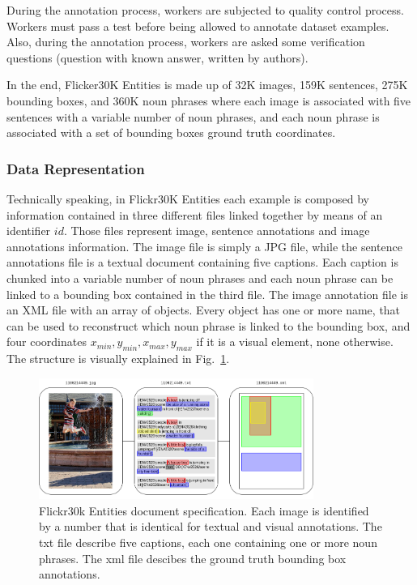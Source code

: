 During the annotation process, workers are subjected to quality
control process. Workers must pass a test before being allowed to
annotate dataset examples. Also, during the annotation process,
workers are asked some verification questions (question with known
answer, written by authors).

In the end, Flicker30K Entities is made up of 32K images, 159K
sentences, 275K bounding boxes, and 360K noun phrases where each image
is associated with five sentences with a variable number of noun
phrases, and each noun phrase is associated with a set of bounding
boxes ground truth coordinates. 

\subsubsection{Data Representation}
\label{subsec:flickr30k-data-representation}

Technically speaking, in Flickr30K Entities each example is composed
by information contained in three different files linked together by
means of an identifier $id$. Those files represent image, sentence
annotations and image annotations information. The image file is
simply a JPG file, while the sentence annotations file is a textual
document containing five captions. Each caption is chunked into a
variable number of noun phrases and each noun phrase can be linked to
a bounding box contained in the third file. The image annotation file
is an XML file with an array of objects. Every object has one or more
name, that can be used to reconstruct which noun phrase is linked to
the bounding box, and four coordinates $x_{min}, y_{min}, x_{max},
y_{max}$ if it is a visual element, none otherwise. The structure is
visually explained in
Fig.~\ref{fig:flickr30k-technical-data-representation}.

\begin{figure}
  \centering
  \includegraphics[width=0.8\textwidth]{figures/flickr30k-document-specification.png}
  \caption[Flickr30k Entities document specification]{ Flickr30k
    Entities document specification. Each image is identified by a
    number that is identical for textual and visual annotations. The
    txt file describe five captions, each one containing one or more
    noun phrases. The xml file descibes the ground truth bounding box
    annotations. }
  \label{fig:flickr30k-technical-data-representation}
\end{figure}

